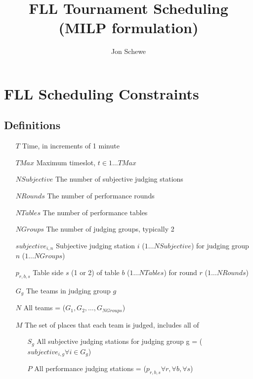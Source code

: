 \documentclass[letterpaper,11pt]{report}
\title{FLL Tournament Scheduling (MILP formulation)}
\author{Jon Schewe}
\begin{document}
\maketitle

\chapter{FLL Scheduling Constraints}

\section{Definitions}
\begin{itemize}

\item[$T$] Time, in increments of 1 minute
\item[$TMax$] Maximum timeslot, $t \in 1 \dots TMax$  
\item[$NSubjective$] The number of subjective judging stations
\item[$NRounds$] The number of performance rounds
\item[$NTables$] The number of performance tables
\item[$NGroups$] The number of judging groups, typically 2
\item[$subjective_{i,n}$] Subjective judging station $i$ ($1 \dots
  NSubjective$) for judging group $n$ ($1 \dots NGroups$)
\item[$p_{r,b,s}$] Table side $s$ (1 or 2) of table $b$ ($1 \dots NTables$) for
  round $r$ ($1 \dots NRounds$)

\item[$G_{g}$] The teams in judging group $g$
\item[$N$] All teams = ($G_{1}, G_{2}, \dots, G_{NGroups}$)

\item[$M$] The set of places that each team is judged, includes all of
  \begin{itemize}
  \item[$S_{g}$] All subjective judging stations for
    judging group g = ($subjective_{i, g} \forall i \in G_{g}$)
  \item[$P$] All performance judging stations = ($p_{r,b,s} \forall r,
    \forall b, \forall s$)
  \end{itemize}



\end{itemize}
\end{document}
